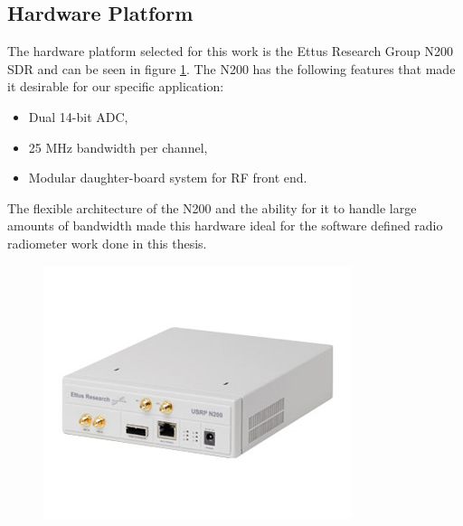 
\subsection{Hardware Platform}
The hardware platform selected for this work is the Ettus Research Group N200 SDR and can be seen in figure \ref{N200}.  The N200 has the following features that made it desirable for our specific application:

\begin{itemize}
\item Dual 14-bit ADC,
\item 25 MHz bandwidth per channel,
\item Modular daughter-board system for RF front end.
\end{itemize}

The flexible architecture of the N200 and the ability for it to handle large amounts of bandwidth made this hardware ideal for the software defined radio radiometer work done in this thesis.

{\begin{figure}[h!tb] 
\centering
\includegraphics{Images/n200}
\label{N200}
\end{figure}
}

